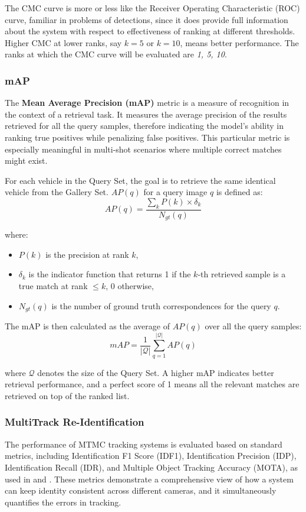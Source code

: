 The CMC curve is more or less like the Receiver Operating Characteristic (ROC) curve, familiar in problems of detections, since it does provide full information about the system with respect to effectiveness of ranking at different thresholds. Higher CMC at lower ranks, say $k = 5$ or $k = 10$, means better performance. The ranks at which the CMC curve will be evaluated are \textit{1, 5, 10}.

\subsubsection{mAP}
The \textbf{Mean Average Precision (mAP)} metric is a measure of recognition in the context of a retrieval task. It measures the average precision of the results retrieved for all the query samples, therefore indicating the model's ability in ranking true positives while penalizing false positives. This particular metric is especially meaningful in multi-shot scenarios where multiple correct matches might exist.

For each vehicle in the Query Set, the goal is to retrieve the same identical vehicle from the Gallery Set. $AP(q)$ for a query image $q$ is defined as:
\[
    AP(q) = \frac{\sum\limits_{k} P(k) \times \delta_{k}}{N_{gt}(q)}
\]

where:
\begin{itemize}
    \item $P(k)$ is the precision at rank $k$,
    \item $\delta_{k}$ is the indicator function that returns 1 if the $k$-th retrieved sample is a true match at rank $\leq k$, 0 otherwise,
    \item $N_{gt}(q)$ is the number of ground truth correspondences for the query $q$.
\end{itemize}

The mAP is then calculated as the average of $AP(q)$ over all the query samples:
\[
    mAP = \frac{1}{|\mathcal{Q}|} \sum_{q=1}^{|\mathcal{Q}|} AP(q)
\]

where $\mathcal{Q}$ denotes the size of the Query Set. A higher mAP indicates better retrieval performance, and a perfect score of 1 means all the relevant matches are retrieved on top of the ranked list.

\subsubsection{MultiTrack Re-Identification}
The performance of MTMC tracking systems is evaluated based on standard metrics, including Identification F1 Score (IDF1), Identification Precision (IDP), Identification Recall (IDR), and Multiple Object Tracking Accuracy (MOTA), as used in \cite{AICityChallenge} and \cite{MTMC-Metrics}. These metrics demonstrate a comprehensive view of how a system can keep identity consistent across different cameras, and it simultaneously quantifies the errors in tracking.

